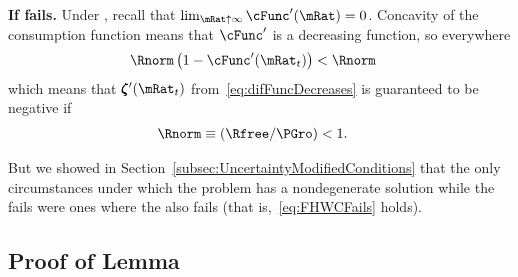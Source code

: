 \documentclass[\econtexRoot/BufferStockTheory]{subfiles}
\begin{document}
\textbf{If {\RIC} fails.}
Under \cncl{\RIC}, recall that $\lim_{\mRat \uparrow \infty} \cFunc^{\prime}(\mRat) = 0$.  Concavity of the consumption function means that $\cFunc^{\prime}$ is a decreasing function, so everywhere 
\begin{align*}
  \Rnorm\left(1-\cFunc^{\prime}({\mRat}_t)\right) & < \Rnorm
\end{align*}
which means that $\difFunc^{\prime}(\mRat_{t})$ from~\eqref{eq:difFuncDecreases} is guaranteed to be negative if
\begin{equation}\begin{gathered}\begin{aligned}
  \Rnorm \equiv (\Rfree/\PGro) & < 1  \label{eq:FHWCFails}.
\end{aligned}\end{gathered}\end{equation}

But we showed in Section~\ref{subsec:UncertaintyModifiedConditions} that the only circumstances under which the problem has a nondegenerate solution while the {\RIC} fails were ones where the {\FHWC} also fails (that is,~\eqref{eq:FHWCFails} holds).

\subsection{Proof of Lemma}

\begin{comment}
\subsection{Comment}


Due to the model's nonlinearities the values of $\mRat$ at which the expected growth rate of $\cLevBF$ matches $\PGro$ is very slightly different from the $\mRat$ at which the growth rate at which expected growth of $\mLevBF$ is $\PGro$.  Defining $\grave{\mRat}$ as the $\mRat$ at which $\Ex_{t}[\cRatBF_{t+1}/\cRatBF_{t}]=\PGro$, we can show that to first order $\grave{\mRat} \approx \check{\mRat}.$
\begin{align*}
  \Ex_{t}[\cFunc(\mRat_{t+1})\pShk_{t+1}] & = \cFunc(\mRat_{t}) \label{eq:balgrostableC}.
  \\ \Ex_{t}[\left(\cFunc(\grave{\mRat})+\cFunc^{\prime}(\grave{\mRat})(\mRat_{t+1}-\grave{\mRat})\right)\pShk_{t+1}] & \approx \cFunc(\grave{\mRat})
  \\ \Ex_{t}[\left(\cFunc^{\prime}(\grave{\mRat})(\mRat_{t+1}-\grave{\mRat})\right)\pShk_{t+1}] & \approx 0
  \\ \Ex_{t}[\mRat_{t+1}] & \approx \grave{\mRat} 
\end{align*}
but at $\mRat=\check{\mRat}$, $\Ex_{t}[\mRat_{t+1}]=\check{\mRat}\approx\grave{\mRat}$.
\end{comment}
\end{document}
